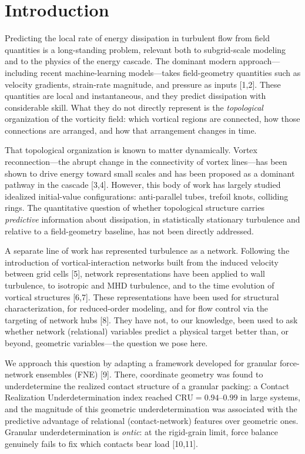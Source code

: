 \documentclass[11pt,a4paper]{article}
\begin{document}
\section{Introduction}

Predicting the local rate of energy dissipation in turbulent flow from field quantities is a long-standing problem, relevant both to subgrid-scale modeling and to the physics of the energy cascade. The dominant modern approach---including recent machine-learning models---takes field-geometry quantities such as velocity gradients, strain-rate magnitude, and pressure as inputs [1,2]. These quantities are local and instantaneous, and they predict dissipation with considerable skill. What they do not directly represent is the \emph{topological} organization of the vorticity field: which vortical regions are connected, how those connections are arranged, and how that arrangement changes in time.

That topological organization is known to matter dynamically. Vortex reconnection---the abrupt change in the connectivity of vortex lines---has been shown to drive energy toward small scales and has been proposed as a dominant pathway in the cascade [3,4]. However, this body of work has largely studied idealized initial-value configurations: anti-parallel tubes, trefoil knots, colliding rings. The quantitative question of whether topological structure carries \emph{predictive} information about dissipation, in statistically stationary turbulence and relative to a field-geometry baseline, has not been directly addressed.

A separate line of work has represented turbulence as a network. Following the introduction of vortical-interaction networks built from the induced velocity between grid cells [5], network representations have been applied to wall turbulence, to isotropic and MHD turbulence, and to the time evolution of vortical structures [6,7]. These representations have been used for structural characterization, for reduced-order modeling, and for flow control via the targeting of network hubs [8]. They have not, to our knowledge, been used to ask whether network (relational) variables predict a physical target better than, or beyond, geometric variables---the question we pose here.

We approach this question by adapting a framework developed for granular force-network ensembles (FNE) [9]. There, coordinate geometry was found to underdetermine the realized contact structure of a granular packing: a Contact Realization Underdetermination index reached $\mathrm{CRU} = 0.94$--$0.99$ in large systems, and the magnitude of this geometric underdetermination was associated with the predictive advantage of relational (contact-network) features over geometric ones. Granular underdetermination is \emph{ontic}: at the rigid-grain limit, force balance genuinely fails to fix which contacts bear load [10,11].
\end{document}
